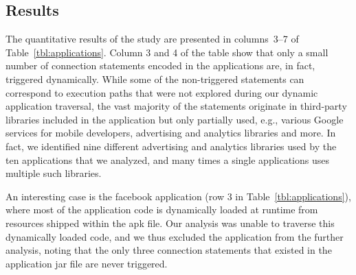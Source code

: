 \subsection{Results}
The quantitative results of the study are presented in columns~3--7 of Table~\ref{tbl:applications}. 
Column 3 and 4 of the table show that only a small number of connection statements encoded in the applications are, in fact, triggered dynamically. 
While some of the non-triggered statements can correspond to execution paths that were not explored during our dynamic application traversal, the vast majority of the statements originate in  
third-party libraries included in the application but only partially used, e.g., various Google services for mobile developers, advertising and analytics libraries and more.
In fact, we identified nine different advertising and analytics libraries used by the ten applications that we analyzed, 
and many times a single applications uses multiple such libraries.

An interesting case is the facebook application (row 3 in Table~\ref{tbl:applications}), where most of the application code is dynamically loaded at runtime from resources shipped within the apk file. 
Our analysis was unable to traverse this dynamically loaded code, and we thus excluded the application from the further analysis, noting that the only three connection statements that existed in the application jar file are never triggered. 

\begin{table}[t]
\caption{Communication Types.}
\label{tbl:statementTypes}
\centering
\end{table}


